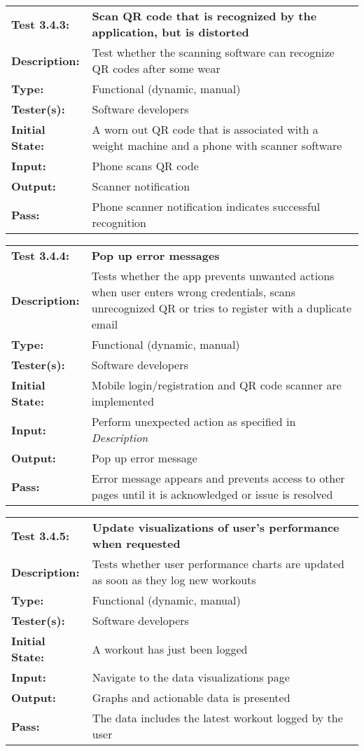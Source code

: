 \documentclass{article}
\newenvironment{testcase}
    {
    \begin{center}
    \begin{mdframed}[
        userdefinedwidth=15.5cm,
        leftmargin=1cm,
        rightmargin=1cm
        ]
    \begin{tabular}{p{2.5cm} p{9cm}}
    }
    {
    \end{tabular}
    \end{mdframed}
    \end{center}
    }
\newcommand{\tctit}[2]{\textbf{#1} & \textbf{#2}}
\newcommand{\tcdesc}{\textbf{Description:}}
\newcommand{\tctype}{\textbf{Type:}}
\newcommand{\testers}{\textbf{Tester(s):}}
\newcommand{\tcinit}{\textbf{Initial State:}}
\newcommand{\tcin}{\textbf{Input:}}
\newcommand{\tcout}{\textbf{Output:}}
\newcommand{\tcpass}{\textbf{Pass:}}
\begin{document}
\begingroup
\begin{testcase}
\tctit{Test 3.4.3:}{Scan QR code that is recognized by the application, but is distorted} \\
\tcdesc & Test whether the scanning software can recognize QR codes after some wear \\
\tctype & Functional (dynamic, manual) \\
\testers & Software developers \\
\tcinit & A worn out QR code that is associated with a weight machine and a phone with scanner software\\
\tcin & Phone scans QR code\\
\tcout & Scanner notification\\
\tcpass & Phone scanner notification indicates successful recognition \\
\end{testcase}
\endgroup

\begingroup
\begin{testcase}
\tctit{Test 3.4.4:}{Pop up error messages} \\
\tcdesc & Tests whether the app prevents unwanted actions when user enters wrong credentials, scans unrecognized QR or tries to register with a duplicate email \\
\tctype & Functional (dynamic, manual) \\
\testers & Software developers \\
\tcinit & Mobile login/registration and QR code scanner are implemented \\
\tcin & Perform unexpected action as specified in \textit{Description}\\
\tcout & Pop up error message\\
\tcpass & Error message appears and prevents access to other pages until it is acknowledged or issue is resolved \\
\end{testcase}
\endgroup

\begingroup
\begin{testcase}
\tctit{Test 3.4.5:}{Update visualizations of user’s performance when requested} \\
\tcdesc & Tests whether user performance charts are updated as soon as they log new workouts\\
\tctype & Functional (dynamic, manual) \\
\testers & Software developers \\
\tcinit & A workout has just been logged \\
\tcin & Navigate to the data visualizations page\\
\tcout & Graphs and actionable data is presented\\
\tcpass & The data includes the latest workout logged by the user\\
\end{testcase}
\endgroup
\end{document}
